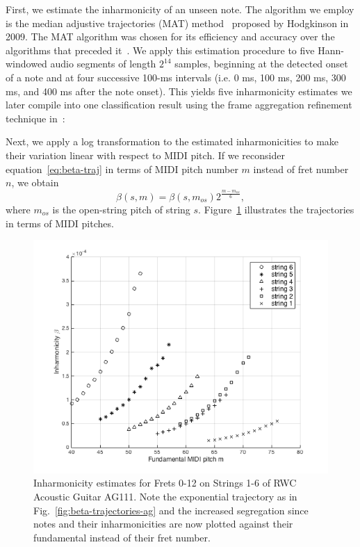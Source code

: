 \documentclass[convention,peer-reviewed]{aesconf}
\begin{document}
First, we estimate the inharmonicity of an unseen note. The algorithm we employ is the median adjustive trajectories (MAT) method~\cite{hodgkinson2009} proposed by Hodgkinson in 2009. The MAT algorithm was chosen for its efficiency and accuracy over the algorithms that preceded it~\cite{hodgkinson2009}. We apply this estimation procedure to five Hann-windowed audio segments of length $2^{14}$ samples, beginning at the detected onset of a note and at four successive 100-ms intervals (i.e. 0 ms, 100 ms, 200 ms, 300 ms, and 400 ms after the note onset). This yields five inharmonicity estimates we later compile into one classification result using the frame aggregation refinement technique in~\cite{abesser2012}: 

Next, we apply a log transformation to the estimated inharmonicities to make their variation linear with respect to MIDI pitch. If we reconsider equation~\eqref{eq:beta-traj} in terms of MIDI pitch number $m$ instead of fret number $n$, we obtain
\begin{equation}
\beta(s,m) = \beta(s,m_{os})2^{\frac{m-m_{os}}{6}},
\end{equation}
where $m_{os}$ is the open-string pitch of string $s$. Figure~\ref{fig:beta-v-midi} illustrates the trajectories in terms of MIDI pitches.
\begin{figure}[h] 
\centering
\includegraphics[scale=0.35]{beta-v-midi}
\caption{Inharmonicity estimates for Frets 0-12 on Strings 1-6 of RWC Acoustic Guitar AG111. Note the exponential trajectory as in Fig.~\ref{fig:beta-trajectories-ag} and the increased segregation since notes and their inharmonicities are now plotted against their fundamental instead of their fret number.}
\label{fig:beta-v-midi}
\end{figure}
\end{document}
